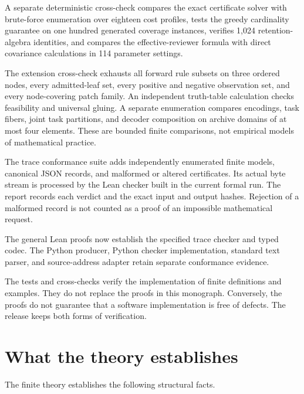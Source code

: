 \documentclass[11pt,oneside]{article}
\theoremstyle{komorebiplain}
\theoremstyle{komorebidefinition}
\theoremstyle{komorebiremark}
\begin{document}
A separate deterministic cross-check compares the exact certificate solver with brute-force enumeration over eighteen cost profiles, tests the greedy cardinality guarantee on one hundred generated coverage instances, verifies 1,024 retention-algebra identities, and compares the effective-reviewer formula with direct covariance calculations in 114 parameter settings.

The extension cross-check exhausts all forward rule subsets on three ordered nodes, every admitted-leaf set, every positive and negative observation set, and every node-covering patch family. An independent truth-table calculation checks feasibility and universal gluing. A separate enumeration compares encodings, task fibers, joint task partitions, and decoder composition on archive domains of at most four elements. These are bounded finite comparisons, not empirical models of mathematical practice.

The trace conformance suite adds independently enumerated finite models, canonical JSON records, and malformed or altered certificates. Its actual byte stream is processed by the Lean checker built in the current formal run. The report records each verdict and the exact input and output hashes. Rejection of a malformed record is not counted as a proof of an impossible mathematical request.

The general Lean proofs now establish the specified trace checker and typed codec. The Python producer, Python checker implementation, standard text parser, and source-address adapter retain separate conformance evidence.

The tests and cross-checks verify the implementation of finite definitions and examples. They do not replace the proofs in this monograph. Conversely, the proofs do not guarantee that a software implementation is free of defects. The release keeps both forms of verification.


\section{What the theory establishes}
\label{sec:old26}

The finite theory establishes the following structural facts.
\end{document}
